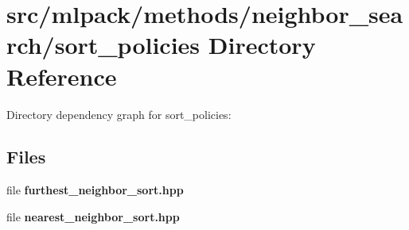 \section{src/mlpack/methods/neighbor\-\_\-search/sort\-\_\-policies Directory Reference}
\label{dir_2d8784b552a572a7492f65051c1eeaf4}
Directory dependency graph for sort\-\_\-policies\-:
\subsection*{Files}
\begin{DoxyCompactItemize}
\item 
file {\bf furthest\-\_\-neighbor\-\_\-sort.\-hpp}
\item 
file {\bf nearest\-\_\-neighbor\-\_\-sort.\-hpp}
\end{DoxyCompactItemize}
